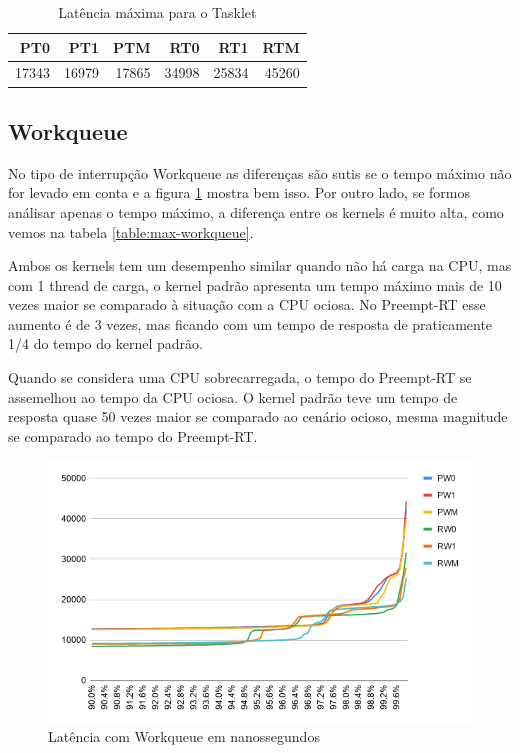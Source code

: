 \begin{table}[!htb]
    \centering
    \begin{center}
        \begin{tabular}{|r|r|r|r|r|r|}
            \toprule
                PT0 &    PT1 &    PTM &    RT0 &     RT1 &    RTM \\
            \midrule
                17343 &	16979 &	17865 & 34998 &	25834 &	45260 \\
            \bottomrule
        \end{tabular}
    \end{center}
    \caption{Latência máxima para o Tasklet}
    \label{table:max-tasklet}
\end{table}


\subsection{Workqueue}

No tipo de interrupção Workqueue as diferenças são sutis se o tempo máximo não for levado em conta e a figura \ref{grafico:workqueue} mostra bem isso. Por outro lado, se formos análisar apenas o tempo máximo, a diferença entre os kernels é muito alta, como vemos na tabela \ref{table:max-workqueue}.

Ambos os kernels tem um desempenho similar quando não há carga na CPU, mas com 1 thread de carga, o kernel padrão apresenta um tempo máximo mais de 10 vezes maior se comparado à situação com a CPU ociosa. No Preempt-RT esse aumento é de 3 vezes, mas ficando com um tempo de resposta de praticamente 1/4 do tempo do kernel padrão.

Quando se considera uma CPU sobrecarregada, o tempo do Preempt-RT se assemelhou ao tempo da CPU ociosa. O kernel padrão teve um tempo de resposta quase 50 vezes maior se comparado ao cenário ocioso, mesma magnitude se comparado ao tempo do Preempt-RT.

\begin{figure}[!htb]
    \centering
    \includegraphics[width=1.0\textwidth]{graficos/workqueue.png}
    \caption{Latência com Workqueue em nanossegundos}
    \label{grafico:workqueue}
\end{figure}

